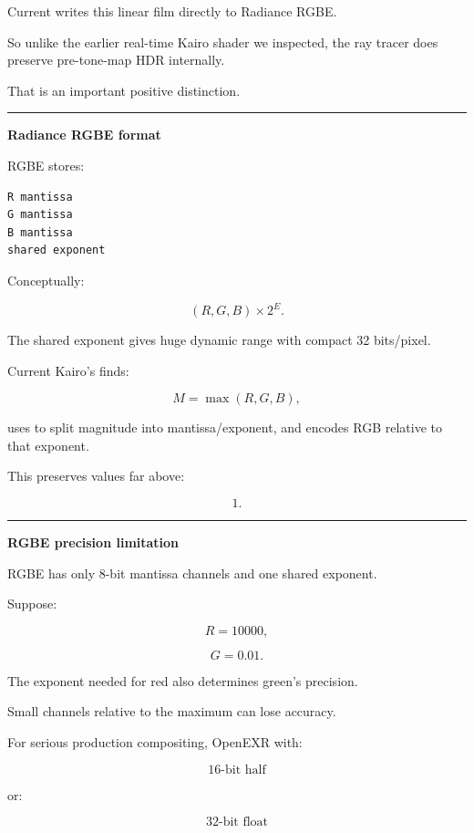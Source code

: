 Current  writes this linear film directly to Radiance RGBE.

So unlike the earlier real-time Kairo shader we inspected, the ray tracer does preserve pre-tone-map HDR internally.

That is an important positive distinction.

\begin{center}\rule{0.5\linewidth}{0.5pt}\end{center}

\textbf{Radiance RGBE format}

RGBE stores:

\begin{verbatim}
R mantissa
G mantissa
B mantissa
shared exponent
\end{verbatim}

Conceptually:

\[
(R,G,B)\times2^E.
\]

The shared exponent gives huge dynamic range with compact 32 bits/pixel.

Current Kairo's  finds:

\[
M=\max(R,G,B),
\]

uses  to split magnitude into mantissa/exponent, and encodes RGB relative to that exponent.

This preserves values far above:

\[
1.
\]

\begin{center}\rule{0.5\linewidth}{0.5pt}\end{center}

\textbf{RGBE precision limitation}

RGBE has only 8-bit mantissa channels and one shared exponent.

Suppose:

\[
R=10000,
\]

\[
G=0.01.
\]

The exponent needed for red also determines green's precision.

Small channels relative to the maximum can lose accuracy.

For serious production compositing, OpenEXR with:

\[
16\text{-bit half}
\]

or:

\[
32\text{-bit float}
\]

